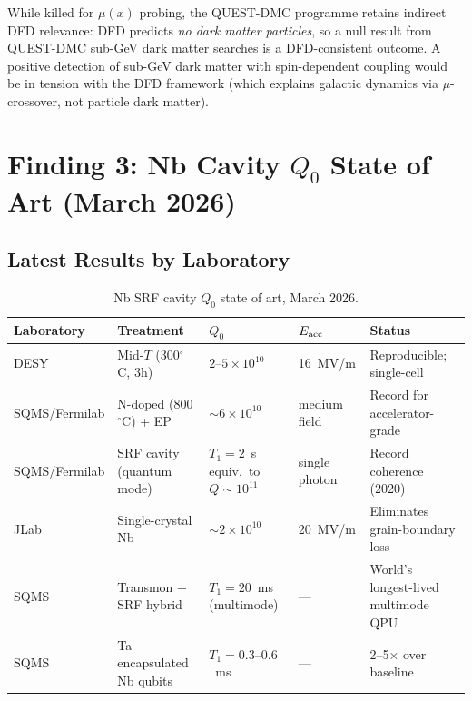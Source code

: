 \documentclass[11pt]{article}
\theoremstyle{definition}
\theoremstyle{remark}
\newcommand{\ee}[1]{\times 10^{#1}}
\begin{document}
While killed for $\mu(x)$ probing, the QUEST-DMC programme retains
indirect DFD relevance: DFD predicts \textit{no dark matter particles},
so a null result from QUEST-DMC sub-GeV dark matter searches is a
DFD-consistent outcome. A positive detection of sub-GeV dark matter
with spin-dependent coupling would be in tension with the
DFD framework (which explains galactic dynamics via $\mu$-crossover,
not particle dark matter).


\section{Finding 3: Nb Cavity $Q_0$ State of Art (March 2026)}
\label{sec:nb_q0}

\subsection{Latest Results by Laboratory}

\begin{table}[H]
\centering
\caption{Nb SRF cavity $Q_0$ state of art, March 2026.}
\label{tab:q0_status}
\renewcommand{\arraystretch}{1.3}
\begin{tabular}{p{3cm}p{3cm}p{2cm}p{2cm}p{3cm}}
\toprule
\textbf{Laboratory} & \textbf{Treatment} & \textbf{$Q_0$} &
\textbf{$E_{\rm acc}$} & \textbf{Status} \\
\midrule
DESY & Mid-$T$ (300$^\circ$C, 3h) &
  $2$--$5\ee{10}$ & 16~MV/m &
  Reproducible; single-cell \\
SQMS/Fermilab & N-doped (800$^\circ$C) + EP &
  $\sim 6\ee{10}$ & medium field &
  Record for accelerator-grade \\
SQMS/Fermilab & SRF cavity (quantum mode) &
  $T_1 = 2$~s equiv.\ to $Q \sim 10^{11}$ & single photon &
  Record coherence (2020) \\
JLab & Single-crystal Nb &
  $\sim 2\ee{10}$ & 20~MV/m &
  Eliminates grain-boundary loss \\
SQMS & Transmon + SRF hybrid &
  $T_1 = 20$~ms (multimode) & --- &
  World's longest-lived multimode QPU \\
SQMS & Ta-encapsulated Nb qubits &
  $T_1 = 0.3$--$0.6$~ms & --- &
  2--5$\times$ over baseline \\
\bottomrule
\end{tabular}
\end{table}
\end{document}
